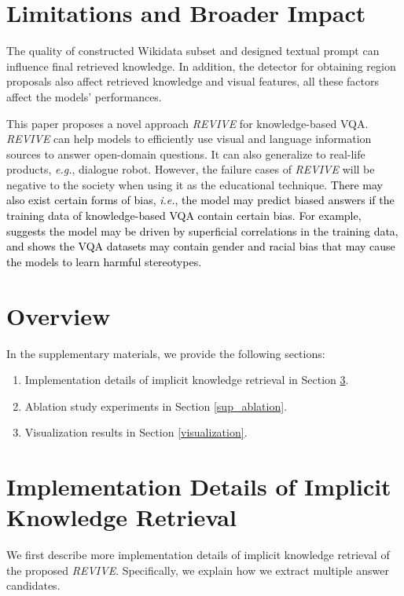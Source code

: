 \documentclass{article}
\begin{document}
\section{Limitations and Broader Impact}
The quality of constructed Wikidata subset and designed textual prompt can influence final retrieved knowledge. In addition, the detector for obtaining region proposals also affect retrieved knowledge and visual features, all these factors affect the models' performances.

This paper proposes a novel approach \textit{REVIVE} for knowledge-based VQA. \textit{REVIVE} can help models to efficiently use visual and language information sources to answer open-domain questions. It can also generalize to real-life products, \textit{e.g.}, dialogue robot. However, the failure cases of \textit{REVIVE} will be negative to the society when using it as the educational technique. \textcolor{black}{There may also exist certain forms of bias,  \textit{i.e.}, the model may predict biased answers if the training data of knowledge-based VQA contain certain bias. For example, \cite{agrawal2018don} suggests the model may be driven by superficial correlations in the training data, and \cite{hirota2022gender} shows the VQA datasets may contain gender and racial bias that may cause the
models to learn harmful stereotypes.}

 


\newpage
\appendix 

\section{Overview}
In the supplementary materials, we provide the following sections:

\begin{enumerate}[label=(\alph*)]
\item Implementation details of implicit knowledge retrieval in Section \ref{implementation}.
 
\item Ablation study experiments in Section \ref{sup_ablation}.
   
\item Visualization results in Section \ref{visualization}.

\end{enumerate}

\section{Implementation Details of Implicit Knowledge Retrieval}
\label{implementation}
We first describe more implementation details of implicit knowledge retrieval of the proposed \textit{REVIVE}. Specifically, we explain how we extract multiple answer candidates.
\end{document}
